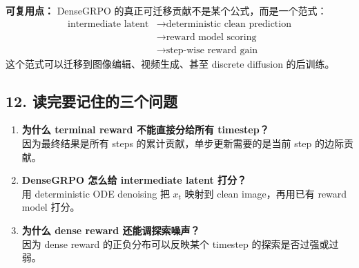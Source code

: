 \begin{summarybox}
\textbf{可复用点：} DenseGRPO 的真正可迁移贡献不是某个公式，而是一个范式：
\[
\begin{aligned}
\text{intermediate latent}
&\rightarrow \text{deterministic clean prediction}\\
&\rightarrow \text{reward model scoring}\\
&\rightarrow \text{step-wise reward gain}
\end{aligned}
\]
这个范式可以迁移到图像编辑、视频生成、甚至 discrete diffusion 的后训练。
\end{summarybox}

\subsection{12. 读完要记住的三个问题}

\begin{enumerate}[leftmargin=1.5em]
  \item \textbf{为什么 terminal reward 不能直接分给所有 timestep？}\\
  因为最终结果是所有 steps 的累计贡献，单步更新需要的是当前 step 的边际贡献。
  \item \textbf{DenseGRPO 怎么给 intermediate latent 打分？}\\
  用 deterministic ODE denoising 把 \(x_t\) 映射到 clean image，再用已有 reward model 打分。
  \item \textbf{为什么 dense reward 还能调探索噪声？}\\
  因为 dense reward 的正负分布可以反映某个 timestep 的探索是否过强或过弱。
\end{enumerate}
